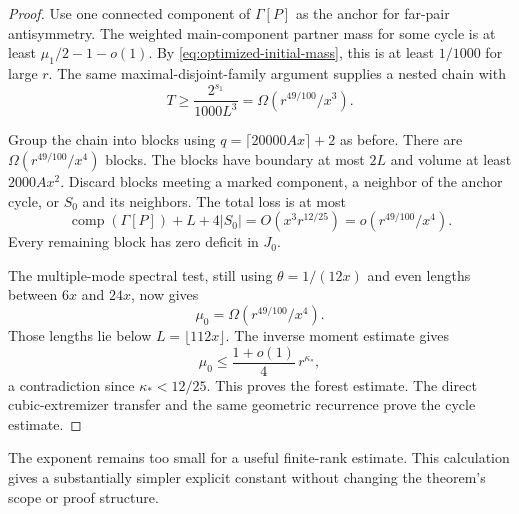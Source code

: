 \begin{proof}
Use one connected component of $\Gamma[P]$ as the anchor for far-pair antisymmetry.
The weighted main-component partner mass for some cycle is at least
$\mu_1/2-1-o(1)$.
By \eqref{eq:optimized-initial-mass}, this is at least $1/1000$ for large $r$.
The same maximal-disjoint-family argument supplies a nested chain with
\[
 T\ge\frac{2^{s_1}}{1000L^3}
 =\Omega(r^{49/100}/x^3).
\]

Group the chain into blocks using $q=\lceil20000Ax\rceil+2$ as before.
There are $\Omega(r^{49/100}/x^4)$ blocks.
The blocks have boundary at most $2L$ and volume at least $2000Ax^2$.
Discard blocks meeting a marked component, a neighbor of the anchor cycle, or $S_0$ and its neighbors.
The total loss is at most
\[
 \operatorname{comp}(\Gamma[P])+L+4|S_0|
 =O(x^3r^{12/25})
 =o(r^{49/100}/x^4).
\]
Every remaining block has zero deficit in $J_0$.

The multiple-mode spectral test, still using $\theta=1/(12x)$ and even lengths between $6x$ and $24x$, now gives
\[
 \mu_0=\Omega(r^{49/100}/x^4).
\]
Those lengths lie below $L=\lfloor112x\rfloor$.
The inverse moment estimate gives
\[
 \mu_0\le\frac{1+o(1)}4\,r^{\kappa_*},
\]
a contradiction since $\kappa_*<12/25$.
This proves the forest estimate.
The direct cubic-extremizer transfer and the same geometric recurrence prove the cycle estimate.
\end{proof}

The exponent remains too small for a useful finite-rank estimate.
This calculation gives a substantially simpler explicit constant without changing the theorem's scope or proof structure.
